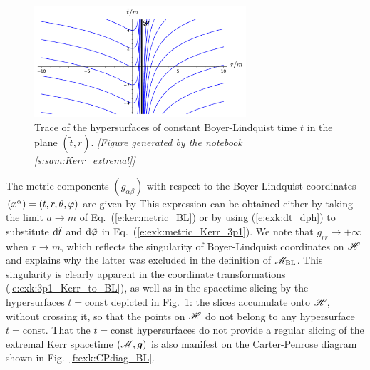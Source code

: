\begin{figure}
\centerline{\includegraphics[width=0.7\textwidth]{exk_BL_slicing.pdf}}
\caption[]{\label{f:exk:BL_slicing} \footnotesize
Trace of the hypersurfaces of constant Boyer-Lindquist time $t$ in the plane
$(\tilde{t}, r)$.
\textsl{[Figure generated by the notebook \ref{s:sam:Kerr_extremal}]}
}
\end{figure}

The metric components $(g_{\alpha\beta})$ with respect to the Boyer-Lindquist coordinates $(x^\alpha) = (t,r,\theta,\varphi)$ are given by
\be \label{e:exk:metric_BL}
\ee
This expression can be obtained either by taking the limit $a\to m$ of Eq.~(\ref{e:ker:metric_BL})
or by using (\ref{e:exk:dt_dph}) to substitute $\mathrm{d}{\tilde t}$ and $\mathrm{d}{\tilde\varphi}$ in Eq.~(\ref{e:exk:metric_Kerr_3p1}).
We note that $g_{rr}\to +\infty$ when $r\to m$, which reflects the singularity of Boyer-Lindquist
coordinates on $\mathscr{H}$ and explains why the latter was excluded in the definition
of $\mathscr{M}_{\rm BL}$. This singularity is clearly apparent in the coordinate transformations
(\ref{e:exk:3p1_Kerr_to_BL}), as well as in the spacetime slicing by the
hypersurfaces $t=\mathrm{const}$ depicted in Fig.~\ref{f:exk:BL_slicing}: the slices accumulate
onto $\mathscr{H}$, without crossing it, so that the points on $\mathscr{H}$ do not belong to any
hypersurface $t=\mathrm{const}$. That the $t=\mathrm{const}$ hypersurfaces do not provide a
regular slicing of the extremal Kerr spacetime $(\mathscr{M},\bm{g})$ is also manifest on
the Carter-Penrose diagram shown in Fig.~\ref{f:exk:CPdiag_BL}.

